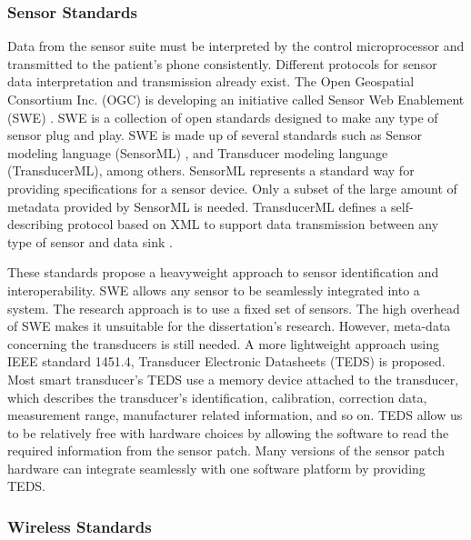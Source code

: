 \subsubsection{Sensor Standards}
\label{subsec:SensorStandars}
Data from the sensor suite must be interpreted by the control microprocessor and transmitted to the patient's phone consistently. Different protocols for sensor data interpretation and transmission already exist.  The Open Geospatial Consortium Inc. (OGC) is developing an initiative called Sensor Web Enablement (SWE) \cite{Botts2007a}. SWE is a collection of open standards designed to make any type of sensor plug and play. SWE is made up of several standards such as Sensor modeling language (SensorML) \cite{Botts2007}, and Transducer modeling language (TransducerML), among others. SensorML represents a standard way for providing specifications for a sensor device. Only a subset of the large amount of metadata provided by SensorML is needed. TransducerML defines a self-describing protocol based on XML to support data transmission between any type of sensor and data sink \cite{Fortier2009}.

These standards propose a heavyweight approach to sensor identification and interoperability. SWE allows any sensor to be seamlessly integrated into a system. The research approach is to use a fixed set of sensors. The high overhead of SWE makes it unsuitable for the dissertation's research. However, meta-data concerning the transducers is still needed. A more lightweight approach using IEEE standard 1451.4, Transducer Electronic Datasheets (TEDS) is proposed. Most smart transducer's TEDS use a memory device attached to the transducer, which describes the transducer's identification, calibration, correction data, measurement range, manufacturer related information, and so on. TEDS allow us to be relatively free with hardware choices by allowing the software to read the required information from the sensor patch. Many versions of the sensor patch hardware can integrate seamlessly with one software platform by providing TEDS. \cite{IEEE1451_4}


\subsubsection{Wireless Standards}
\label{subsubsec:WirelessStandards}

